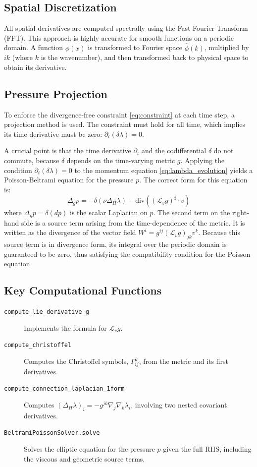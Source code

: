 \documentclass{article}
\begin{document}
\subsection{Spatial Discretization}
All spatial derivatives are computed spectrally using the Fast Fourier Transform (FFT). This approach is highly accurate for smooth functions on a periodic domain. A function $\phi(x)$ is transformed to Fourier space $\hat{\phi}(k)$, multiplied by $ik$ (where $k$ is the wavenumber), and then transformed back to physical space to obtain its derivative.

\subsection{Pressure Projection}
To enforce the divergence-free constraint \eqref{eq:constraint} at each time step, a projection method is used. The constraint must hold for all time, which implies its time derivative must be zero: $\partial_t(\delta\lambda) = 0$.

A crucial point is that the time derivative $\partial_t$ and the codifferential $\delta$ do not commute, because $\delta$ depends on the time-varying metric $g$. Applying the condition $\partial_t(\delta\lambda)=0$ to the momentum equation \eqref{eq:lambda_evolution} yields a Poisson-Beltrami equation for the pressure $p$. The correct form for this equation is:
\begin{equation}
    \Delta_g p = -\delta(\nu \Delta_H \lambda) - \text{div}\left( (\mathcal{L}_v g)^\sharp \cdot v \right)
\end{equation}
where $\Delta_g p = \delta(dp)$ is the scalar Laplacian on $p$. The second term on the right-hand side is a source term arising from the time-dependence of the metric. It is written as the divergence of the vector field $W^i = g^{ij}(\mathcal{L}_v g)_{jk}v^k$. Because this source term is in divergence form, its integral over the periodic domain is guaranteed to be zero, thus satisfying the compatibility condition for the Poisson equation.

\subsection{Key Computational Functions}
\begin{description}
    \item[\texttt{compute\_lie\_derivative\_g}] Implements the formula for $\mathcal{L}_v g$.

    \item[\texttt{compute\_christoffel}] Computes the Christoffel symbols, $\Gamma^k_{ij}$, from the metric and its first derivatives.

    \item[\texttt{compute\_connection\_laplacian\_1form}] Computes $(\Delta_H \lambda)_i = -g^{jk}\nabla_j\nabla_k \lambda_i$, involving two nested covariant derivatives.

    \item[\texttt{BeltramiPoissonSolver.solve}] Solves the elliptic equation for the pressure $p$ given the full RHS, including the viscous and geometric source terms.
\end{description}
\end{document}
